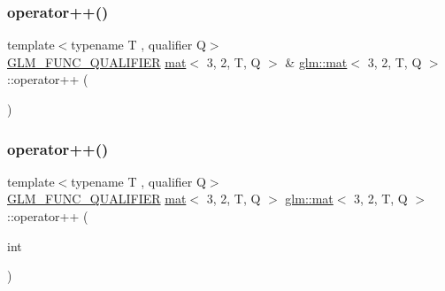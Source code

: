 \mbox{\label{structglm_1_1mat_3_013_00_012_00_01_t_00_01_q_01_4_ad68d45e51b9606b49706ac69d2a68609}} 
\subsubsection{\texorpdfstring{operator++()}{operator++()}\hspace{0.1cm}{\footnotesize\ttfamily [1/2]}}
{\footnotesize\ttfamily template$<$typename T , qualifier Q$>$ \\
\mbox{\hyperlink{setup_8hpp_a33fdea6f91c5f834105f7415e2a64407}{G\+L\+M\+\_\+\+F\+U\+N\+C\+\_\+\+Q\+U\+A\+L\+I\+F\+I\+ER}} \mbox{\hyperlink{structglm_1_1mat}{mat}}$<$ 3, 2, T, Q $>$ \& \mbox{\hyperlink{structglm_1_1mat}{glm\+::mat}}$<$ 3, 2, T, Q $>$\+::operator++ (\begin{DoxyParamCaption}{ }\end{DoxyParamCaption})}

\mbox{\label{structglm_1_1mat_3_013_00_012_00_01_t_00_01_q_01_4_ac1de03304a1fcb496a374a06854e3d7a}} 
\subsubsection{\texorpdfstring{operator++()}{operator++()}\hspace{0.1cm}{\footnotesize\ttfamily [2/2]}}
{\footnotesize\ttfamily template$<$typename T , qualifier Q$>$ \\
\mbox{\hyperlink{setup_8hpp_a33fdea6f91c5f834105f7415e2a64407}{G\+L\+M\+\_\+\+F\+U\+N\+C\+\_\+\+Q\+U\+A\+L\+I\+F\+I\+ER}} \mbox{\hyperlink{structglm_1_1mat}{mat}}$<$ 3, 2, T, Q $>$ \mbox{\hyperlink{structglm_1_1mat}{glm\+::mat}}$<$ 3, 2, T, Q $>$\+::operator++ (\begin{DoxyParamCaption}\item[{int}]{ }\end{DoxyParamCaption})}

\mbox{\label{structglm_1_1mat_3_013_00_012_00_01_t_00_01_q_01_4_a2f7849a67991389dab2de4945f67f1f9}} 
